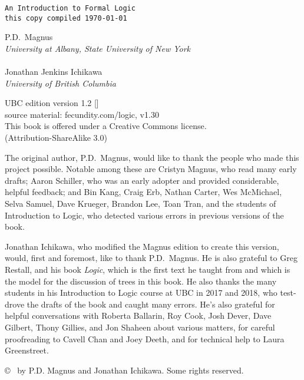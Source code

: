 \thispagestyle{empty}
{\Huge\forallx}

{\tt An Introduction to Formal Logic\\
this copy compiled \today}
\vfill


{\sf P.D.\ Magnus}\\
\emph{University at Albany, State University of New York}\\
\\
{\sf Jonathan Jenkins Ichikawa}\\
\emph{University of British Columbia}



\vfill




{\sf
	UBC edition version 1.2 [\bookversion]\\
	source material: fecundity.com/logic, v1.30\\
	This book is offered under a Creative Commons license.\\
	(Attribution-ShareAlike 3.0)
}



\newpage
\thispagestyle{empty}%
{\sf
The original author, P.D.\ Magnus, would like to thank the people who made this project possible. Notable among these are Cristyn Magnus, who read many early drafts; Aaron Schiller, who was an early adopter and provided considerable, helpful feedback; {and} Bin Kang, Craig Erb, Nathan Carter, Wes McMichael, Selva Samuel,  Dave Krueger, Brandon Lee, Toan Tran, and the students of Introduction to Logic, who detected various errors in previous versions of the book.

Jonathan Ichikawa, who modified the Magnus edition to create this version, would, first and foremost, like to thank P.D.\ Magnus. He is also grateful to Greg Restall, and his book \emph{Logic}, which is the first text he taught from and which is the model for the discussion of trees in this book. He also thanks the many students in his Introduction to Logic course at UBC in 2017 and 2018, who test-drove the drafts of the book and caught many errors. He's also grateful for helpful conversations with Roberta Ballarin, Roy Cook, Josh Dever, Dave Gilbert, Thony Gillies, and Jon Shaheen about various matters, for careful proofreading to Cavell Chan and Joey Deeth, and for technical help to Laura Greenstreet.

}

\vfill
{
\copyright\  by P.D. Magnus and Jonathan Ichikawa. Some rights reserved.
}

